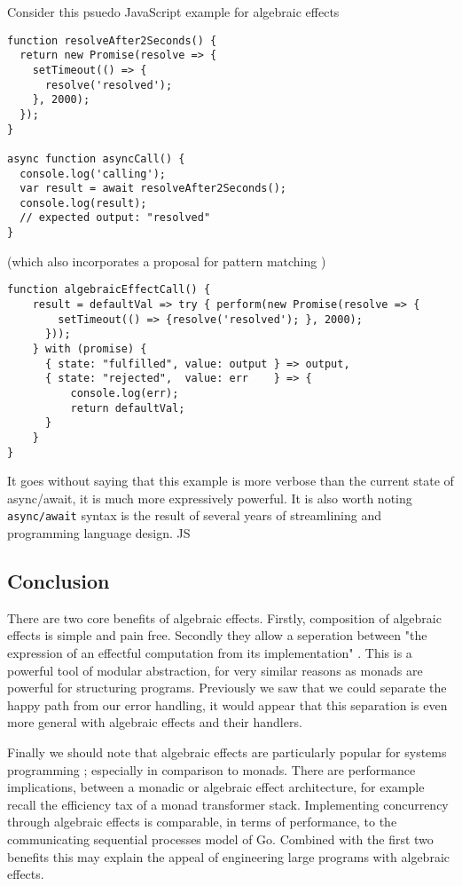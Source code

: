 Consider this psuedo JavaScript example for algebraic effects
\begin{verbatim}
function resolveAfter2Seconds() {
  return new Promise(resolve => {
    setTimeout(() => {
      resolve('resolved');
    }, 2000);
  });
}

async function asyncCall() {
  console.log('calling');
  var result = await resolveAfter2Seconds();
  console.log(result);
  // expected output: "resolved"
}
\end{verbatim}
(which also incorporates a proposal for pattern matching \cite{jspmatch})
\begin{verbatim}
function algebraicEffectCall() {
    result = defaultVal => try { perform(new Promise(resolve => {
        setTimeout(() => {resolve('resolved'); }, 2000);
      }));
    } with (promise) {
      { state: "fulfilled", value: output } => output,
      { state: "rejected",  value: err    } => {
          console.log(err);
          return defaultVal;
      }
    }
}
\end{verbatim}
It goes without saying that this example is more verbose than the current state of async/await,
it is much more expressively powerful.
It is also worth noting \texttt{async/await} syntax is the result of several years of
streamlining and programming language design.
JS 


\subsection{Conclusion}
There are two core benefits of algebraic effects.
Firstly, composition of algebraic effects is simple and pain free.
Secondly they allow a seperation between
"the expression of an effectful computation from its implementation"
\cite{dolan2015effective}.
This is a powerful tool of modular abstraction,
for very similar reasons as monads are powerful
for structuring programs.
Previously we saw that we could separate the happy path from our error handling,
it would appear that this separation is even more general with algebraic effects
and their handlers.

Finally we should note that
algebraic effects are particularly popular for systems programming
\cite{dolan2015effective, dolan2017concurrent, dolaneffectively};
especially in comparison to monads.
There are performance implications,
between a monadic or algebraic effect architecture,
for example recall the efficiency tax of a monad
transformer stack\cite{o2008real}.
Implementing concurrency through algebraic effects
is comparable, in terms of performance,
to the communicating sequential processes model of Go\cite{Dolan:2017}.
Combined with the first two benefits this may explain the
appeal of engineering large programs with algebraic effects.

